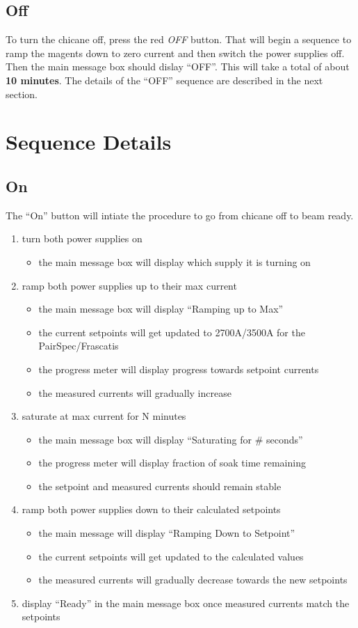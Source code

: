 \documentclass[amsmath,amssymb,notitlepage,11pt]{revtex4-1}
\begin{document}
\subsection{Off}
To turn the chicane off, press the red {\em OFF} button.  That will begin a sequence to ramp the magents down to zero current and then switch the power supplies off.  Then the main message box should dislay ``OFF''.  This will take a total of about {\bf 10 minutes}.  The details of the ``OFF'' sequence are described in the next section.
\newpage
\section{Sequence Details}
\subsection{On}
The ``On'' button will intiate the procedure to go from chicane off to beam ready.
\begin{enumerate}
    \item turn both power supplies on
    \begin{itemize}
    \item the main message box will display which supply it is turning on
    \end{itemize}
    \item ramp both power supplies up to their max current
    \begin{itemize}
    \item the main message box will display ``Ramping up to Max''
    \item the current setpoints will get updated to 2700A/3500A for the PairSpec/Frascatis
    \item the progress meter will display progress towards setpoint currents
    \item the measured currents will gradually increase
    \end{itemize}
    \item saturate at max current for N minutes
    \begin{itemize}
    \item the main message box will display ``Saturating for \# seconds''
    \item the progress meter will display fraction of soak time remaining  
    \item the setpoint and measured currents should remain stable 
    \end{itemize}
    \item ramp both power supplies down to their calculated setpoints
    \begin{itemize}
    \item the main message will display ``Ramping Down to Setpoint''
    \item the current setpoints will get updated to the calculated values
    \item the measured currents will gradually decrease towards the new setpoints
    \end{itemize}
    \item display ``Ready'' in the main message box once measured currents match the setpoints
\end{enumerate}
\end{document}
